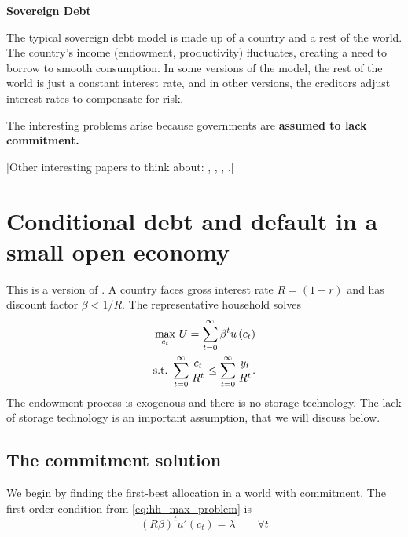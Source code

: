 \documentclass[11pt, pdftex]{article}
\newcommand{\ph}{\phantom}
\begin{document}
\ph{whatever}
\medskip

\centerline{\Large \bf Sovereign Debt}
\medskip

The typical sovereign debt model is made up of a country and a rest of the world.  The country's income (endowment, productivity) fluctuates, creating a need to borrow to smooth  consumption. In some versions of the model, the rest of the world is just a constant interest rate, and in other versions, the creditors adjust interest rates to compensate for risk.

The interesting problems arise because governments are \textbf{assumed to lack commitment.}

[Other interesting papers to think about: \citet{KL01}, \citet{chaterjeeEyigungor}, \citet{Tourre}, \citet{cole2000self}.]

\section{Conditional debt and default in a small open economy}
This is a version of \citet{EG81}. A country faces gross interest rate $R = \left({1 + r} \right)$ and has discount factor $\beta  < 1 /R$. The representative household solves
\begin{align}
  \mathop {\max }\limits_{{c_t}} \,U = \sum\limits_{t = 0}^\infty  {{\beta ^t}u\left( {{c_t}} \right)} \label{eq:hh_max_problem} \\
  \mathrm{s.t.}\,\,\sum\limits_{t = 0}^\infty  {\frac{{{c_t}}}{{{R^t}}}}  \leq \sum\limits_{t = 0}^\infty  {\frac{{{y_t}}}{{{R^t}}}} \notag.
\end{align}	
The endowment process is exogenous and there is no storage technology. The lack of storage technology is an important assumption, that we will discuss below.

\subsection{The commitment solution}
We begin by finding the first-best allocation in a world with commitment. The first order condition from \eqref{eq:hh_max_problem} is
\begin{equation} \label{eq:foc}
{\left( {R\beta } \right)^t}u'\left( {{c_t}} \right) = \lambda  \qquad \forall t
\end{equation}
\end{document}
